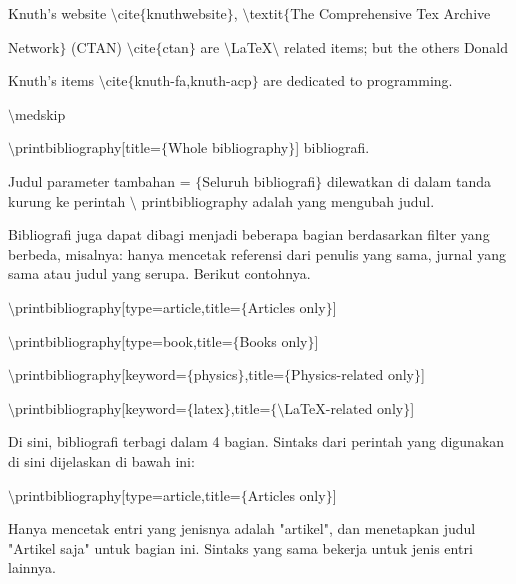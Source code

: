 \begin{itemize}
Knuth's website $\setminus$cite$ \{ $knuthwebsite$ \} $, $\setminus$textit$ \{ $The Comprehensive Tex Archive \par

Network$ \} $ (CTAN) $\setminus$cite$ \{ $ctan$ \} $ are $\setminus$LaTeX$\setminus$ related items; but the others Donald \par

Knuth's items $\setminus$cite$ \{ $knuth-fa,knuth-acp$ \} $ are dedicated to programming. \par

$\setminus$medskip \par

$\setminus$printbibliography[title=$ \{ $Whole bibliography$ \} $] bibliografi.\par

Judul parameter tambahan = $ \{ $Seluruh bibliografi$ \} $ dilewatkan di dalam tanda kurung ke perintah $\setminus$ printbibliography adalah yang mengubah judul.\par

Bibliografi juga dapat dibagi menjadi beberapa bagian berdasarkan filter yang berbeda, misalnya: hanya mencetak referensi dari penulis yang sama, jurnal yang sama atau judul yang serupa. Berikut contohnya.\par

$\setminus$printbibliography[type=article,title=$ \{ $Articles only$ \} $]\par

$\setminus$printbibliography[type=book,title=$ \{ $Books only$ \} $]\par

 \par

$\setminus$printbibliography[keyword=$ \{ $physics$ \} $,title=$ \{ $Physics-related only$ \} $]\par

$\setminus$printbibliography[keyword=$ \{ $latex$ \} $,title=$ \{ $$\setminus$LaTeX-related only$ \} $]\par

Di sini, bibliografi terbagi dalam 4 bagian. Sintaks dari perintah yang digunakan di sini dijelaskan di bawah ini:\par

$\setminus$printbibliography[type=article,title=$ \{ $Articles only$ \} $]\par

Hanya mencetak entri yang jenisnya adalah "artikel", dan menetapkan judul "Artikel saja" untuk bagian ini. Sintaks yang sama bekerja untuk jenis entri lainnya.\par


\end{itemize}
